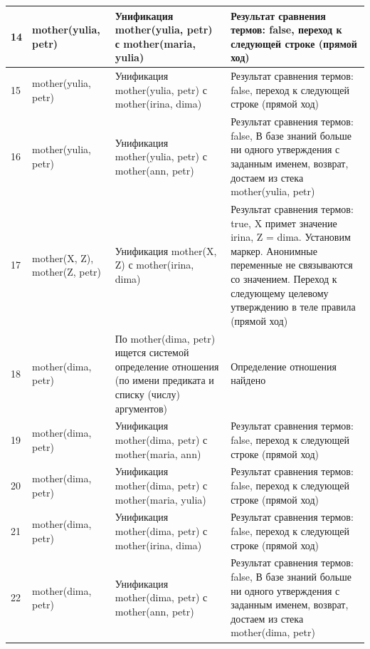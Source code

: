 \documentclass[a4paper,14pt]{extreport} %
\begin{document}
\begin{longtable}{|p{0.5cm}|p{4cm}|p{7cm}|p{5.5cm}|}
	14 &mother(yulia, petr) & Унификация mother(yulia, petr) с mother(maria, yulia) & Результат сравнения термов: false, переход к следующей строке (прямой ход) \\ \hline
	15 &mother(yulia, petr) & Унификация mother(yulia, petr) с mother(irina, dima) & Результат сравнения термов: false, переход к следующей строке (прямой ход) \\ \hline
	16 &mother(yulia, petr) & Унификация mother(yulia, petr) с mother(ann, petr) & Результат сравнения термов: false, В базе знаний больше ни одного утверждения с заданным именем, возврат, достаем из стека mother(yulia, petr) \\ \hline
	
	17 &mother(X, Z), mother(Z, petr)& Унификация mother(X, Z) с mother(irina, dima) & Результат сравнения термов: true, X примет значение irina, Z = dima. Установим маркер. Анонимные переменные не связываются со значением. Переход к следующему целевому утверждению в теле правила (прямой ход) \\ \hline
	18 & mother(dima, petr) & По mother(dima, petr)  ищется системой определение отношения (по имени предиката и списку (числу) аргументов) & Определение отношения найдено \\ \hline
	19 &mother(dima, petr) & Унификация mother(dima, petr) с mother(maria, ann) & Результат сравнения термов: false, переход к следующей строке (прямой ход) \\ \hline
	20 &mother(dima, petr) & Унификация mother(dima, petr) с mother(maria, yulia) & Результат сравнения термов: false, переход к следующей строке (прямой ход) \\ \hline
	21 &mother(dima, petr) & Унификация mother(dima, petr) с mother(irina, dima) & Результат сравнения термов: false, переход к следующей строке (прямой ход) \\ \hline
	22 &mother(dima, petr) & Унификация mother(dima, petr) с mother(ann, petr) & Результат сравнения термов: false, В базе знаний больше ни одного утверждения с заданным именем, возврат, достаем из стека mother(dima, petr) \\ \hline
	

\end{longtable}
\end{document}
